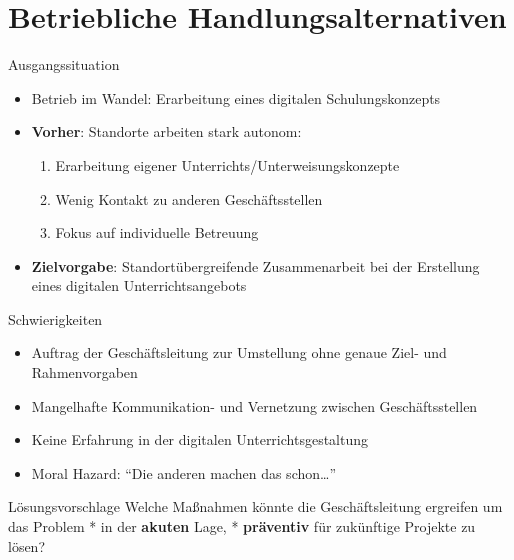 \documentclass[
  10pt,
  ignorenonframetext,
]{beamer}
\providecommand{\tightlist}{%
  \setlength{\itemsep}{0pt}\setlength{\parskip}{0pt}}
\begin{document}
\hypertarget{betriebliche-handlungsalternativen-1}{%
\section{Betriebliche
Handlungsalternativen}\label{betriebliche-handlungsalternativen-1}}

\begin{frame}{Ausgangssituation}
\protect\hypertarget{ausgangssituation}{}
\begin{itemize}
\tightlist
\item
  Betrieb im Wandel: Erarbeitung eines digitalen Schulungskonzepts
\item
  \textbf{Vorher}: Standorte arbeiten stark autonom:

  \begin{enumerate}
  \tightlist
  \item
    Erarbeitung eigener Unterrichts/Unterweisungskonzepte
  \item
    Wenig Kontakt zu anderen Geschäftsstellen
  \item
    Fokus auf individuelle Betreuung
  \end{enumerate}
\item
  \textbf{Zielvorgabe}: Standortübergreifende Zusammenarbeit bei der
  Erstellung eines digitalen Unterrichtsangebots
\end{itemize}
\end{frame}

\begin{frame}{Schwierigkeiten}
\protect\hypertarget{schwierigkeiten}{}
\begin{itemize}
\tightlist
\item
  Auftrag der Geschäftsleitung zur Umstellung ohne genaue Ziel- und
  Rahmenvorgaben
\item
  Mangelhafte Kommunikation- und Vernetzung zwischen Geschäftsstellen
\item
  Keine Erfahrung in der digitalen Unterrichtsgestaltung
\item
  Moral Hazard: ``Die anderen machen das schon\ldots{}''
\end{itemize}
\end{frame}

\begin{frame}{Lösungsvorschlage}
\protect\hypertarget{luxf6sungsvorschlage}{}
Welche Maßnahmen könnte die Geschäftsleitung ergreifen um das Problem *
in der \textbf{akuten} Lage, * \textbf{präventiv} für zukünftige
Projekte zu lösen?
\end{frame}
\end{document}
